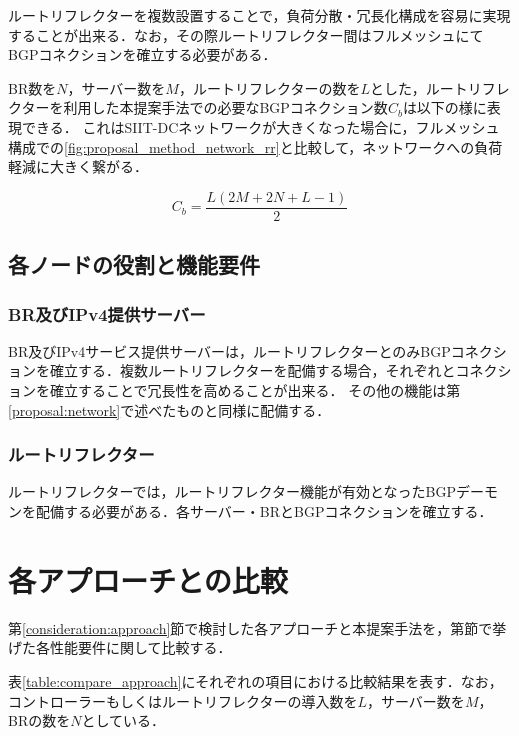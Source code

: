ルートリフレクターを複数設置することで，負荷分散・冗長化構成を容易に実現することが出来る．なお，その際ルートリフレクター間はフルメッシュにてBGPコネクションを確立する必要がある．


BR数を$N$，サーバー数を$M$，ルートリフレクターの数を$L$とした，ルートリフレクターを利用した本提案手法での必要なBGPコネクション数$C_b$は以下の様に表現できる．
これはSIIT-DCネットワークが大きくなった場合に，フルメッシュ構成での\ref{fig:proposal_method_network_rr}と比較して，ネットワークへの負荷軽減に大きく繋がる．

\begin{equation}
    C_b = \frac{L(2M + 2N + L - 1)}{2} 
\end{equation}


\subsection{各ノードの役割と機能要件}
\subsubsection{BR及びIPv4提供サーバー}
BR及びIPv4サービス提供サーバーは，ルートリフレクターとのみBGPコネクションを確立する．複数ルートリフレクターを配備する場合，それぞれとコネクションを確立することで冗長性を高めることが出来る．
その他の機能は第\ref{proposal:network}で述べたものと同様に配備する．

\subsubsection{ルートリフレクター}
ルートリフレクターでは，ルートリフレクター機能が有効となったBGPデーモンを配備する必要がある．各サーバー・BRとBGPコネクションを確立する．


\section{各アプローチとの比較}
第\ref{consideration:approach}節で検討した各アプローチと本提案手法を，第\label{consideration:points}節で挙げた各性能要件に関して比較する．

表\ref{table:compare_approach}にそれぞれの項目における比較結果を表す．なお，コントローラーもしくはルートリフレクターの導入数を$L$，サーバー数を$M$，BRの数を$N$としている．



